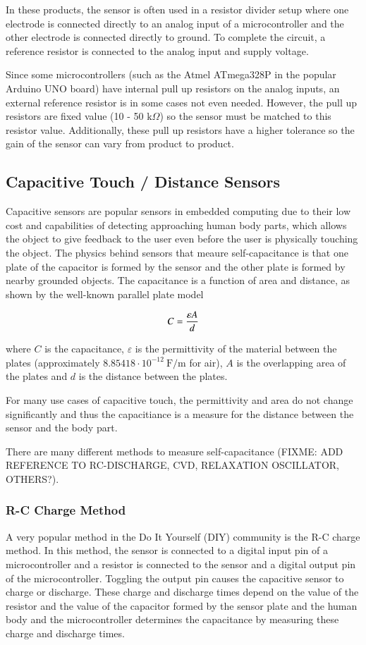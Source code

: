 \documentclass{sigchi}
\begin{document}
In these products, the sensor is often used in a resistor divider setup where
one electrode is connected directly to an analog input of a microcontroller and
the other electrode is connected directly to ground. To complete the circuit, a
reference resistor is connected to the analog input and supply voltage.

Since some microcontrollers (such as the Atmel ATmega328P in the popular Arduino
UNO board) have internal pull up resistors on the analog inputs, an external
reference resistor is in some cases not even needed. However, the pull up
resistors are fixed value (10 - 50 $\textrm{k}\Omega$) so the sensor must be matched to
this resistor value. Additionally, these pull up resistors have a higher
tolerance so the gain of the sensor can vary from product to product.

\subsection{Capacitive Touch / Distance Sensors}
Capacitive sensors are popular sensors in embedded computing due to their low cost
and capabilities of detecting approaching human body parts, which allows the
object to give feedback to the user even before the user is physically touching
the object. The physics behind sensors that meaure self-capacitance is that one
plate of the capacitor is formed by the sensor and the other plate is formed by
nearby grounded objects. The capacitance is a function of area and distance, as
shown by the well-known parallel plate model

\begin{equation}
C = {{\varepsilon A} \over {d}}
\end{equation}

where $C$ is the capacitance, $\varepsilon$ is the permittivity of the material
between the plates (approximately $8.85418 \cdot 10^{-12} ~ \textrm{F/m}$ for
air), $A$ is the overlapping area of the plates and $d$ is the distance between
the plates.

For many use cases of capacitive touch, the permittivity and area do not change
significantly and thus the capacitiance is a measure for the distance between
the sensor and the body part.

There are many different methods to measure
self-capacitance (FIXME: ADD REFERENCE TO RC-DISCHARGE, CVD, RELAXATION
OSCILLATOR, OTHERS?). 

\subsubsection{R-C Charge Method}
A very popular method in the Do It Yourself (DIY) community is the R-C charge
method. In this method, the sensor is connected to a digital input pin of a
microcontroller and a resistor is connected to the sensor and a digital output
pin of the microcontroller. Toggling the output pin causes the capacitive sensor
to charge or discharge. These charge and discharge times depend on the value of
the resistor and the value of the capacitor formed by the sensor plate and the
human body and the microcontroller determines the capacitance by measuring these
charge and discharge times.
\end{document}
